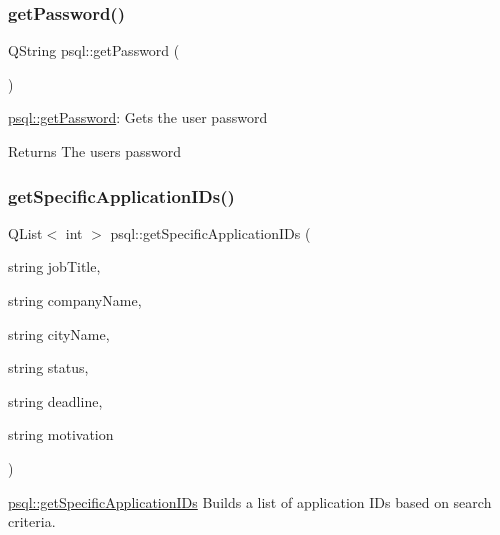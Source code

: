 \subsubsection{\texorpdfstring{getPassword()}{getPassword()}}
{\footnotesize\ttfamily Q\+String psql\+::get\+Password (\begin{DoxyParamCaption}{ }\end{DoxyParamCaption})}



\mbox{\hyperlink{classpsql_a817e5a88f877cac6f843c1e743aec096}{psql\+::get\+Password}}\+: Gets the user password 

\begin{DoxyReturn}{Returns}
The user\textquotesingle{}s password 
\end{DoxyReturn}
\mbox{\label{classpsql_ab6edb8a2e42d8ac7c4ae29f5b0cb494f}} 
\subsubsection{\texorpdfstring{getSpecificApplicationIDs()}{getSpecificApplicationIDs()}}
{\footnotesize\ttfamily Q\+List$<$ int $>$ psql\+::get\+Specific\+Application\+I\+Ds (\begin{DoxyParamCaption}\item[{string}]{job\+Title,  }\item[{string}]{company\+Name,  }\item[{string}]{city\+Name,  }\item[{string}]{status,  }\item[{string}]{deadline,  }\item[{string}]{motivation }\end{DoxyParamCaption})}



\mbox{\hyperlink{classpsql_ab6edb8a2e42d8ac7c4ae29f5b0cb494f}{psql\+::get\+Specific\+Application\+I\+Ds}} Builds a list of application I\+Ds based on search criteria. 


